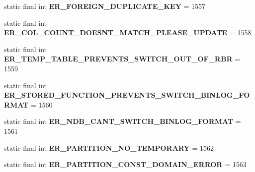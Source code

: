 \begin{DoxyCompactItemize}
static final int {\bfseries E\+R\+\_\+\+F\+O\+R\+E\+I\+G\+N\+\_\+\+D\+U\+P\+L\+I\+C\+A\+T\+E\+\_\+\+K\+EY} = 1557
\item 
\mbox{\label{classcom_1_1mysql_1_1jdbc_1_1_mysql_error_numbers_a49b0d8aa3b22cfc2a8b14a50754a3d9e}} 
static final int {\bfseries E\+R\+\_\+\+C\+O\+L\+\_\+\+C\+O\+U\+N\+T\+\_\+\+D\+O\+E\+S\+N\+T\+\_\+\+M\+A\+T\+C\+H\+\_\+\+P\+L\+E\+A\+S\+E\+\_\+\+U\+P\+D\+A\+TE} = 1558
\item 
\mbox{\label{classcom_1_1mysql_1_1jdbc_1_1_mysql_error_numbers_a2d157d7ae5159e375cc41642d4471023}} 
static final int {\bfseries E\+R\+\_\+\+T\+E\+M\+P\+\_\+\+T\+A\+B\+L\+E\+\_\+\+P\+R\+E\+V\+E\+N\+T\+S\+\_\+\+S\+W\+I\+T\+C\+H\+\_\+\+O\+U\+T\+\_\+\+O\+F\+\_\+\+R\+BR} = 1559
\item 
\mbox{\label{classcom_1_1mysql_1_1jdbc_1_1_mysql_error_numbers_aa632c49973c7c2185f540aa7877b010d}} 
static final int {\bfseries E\+R\+\_\+\+S\+T\+O\+R\+E\+D\+\_\+\+F\+U\+N\+C\+T\+I\+O\+N\+\_\+\+P\+R\+E\+V\+E\+N\+T\+S\+\_\+\+S\+W\+I\+T\+C\+H\+\_\+\+B\+I\+N\+L\+O\+G\+\_\+\+F\+O\+R\+M\+AT} = 1560
\item 
\mbox{\label{classcom_1_1mysql_1_1jdbc_1_1_mysql_error_numbers_adc10430cdf13654fdccf98ad46caf241}} 
static final int {\bfseries E\+R\+\_\+\+N\+D\+B\+\_\+\+C\+A\+N\+T\+\_\+\+S\+W\+I\+T\+C\+H\+\_\+\+B\+I\+N\+L\+O\+G\+\_\+\+F\+O\+R\+M\+AT} = 1561
\item 
\mbox{\label{classcom_1_1mysql_1_1jdbc_1_1_mysql_error_numbers_a2f7bb31901d3419feba3d9b5f51037d0}} 
static final int {\bfseries E\+R\+\_\+\+P\+A\+R\+T\+I\+T\+I\+O\+N\+\_\+\+N\+O\+\_\+\+T\+E\+M\+P\+O\+R\+A\+RY} = 1562
\item 
\mbox{\label{classcom_1_1mysql_1_1jdbc_1_1_mysql_error_numbers_a187ab11cb472c83814780091a2956f63}} 
static final int {\bfseries E\+R\+\_\+\+P\+A\+R\+T\+I\+T\+I\+O\+N\+\_\+\+C\+O\+N\+S\+T\+\_\+\+D\+O\+M\+A\+I\+N\+\_\+\+E\+R\+R\+OR} = 1563
\item 
\mbox{\label{classcom_1_1mysql_1_1jdbc_1_1_mysql_error_numbers_a98f53563b6751f1b0a62d5cbb527257e}} 

\end{DoxyCompactItemize}
